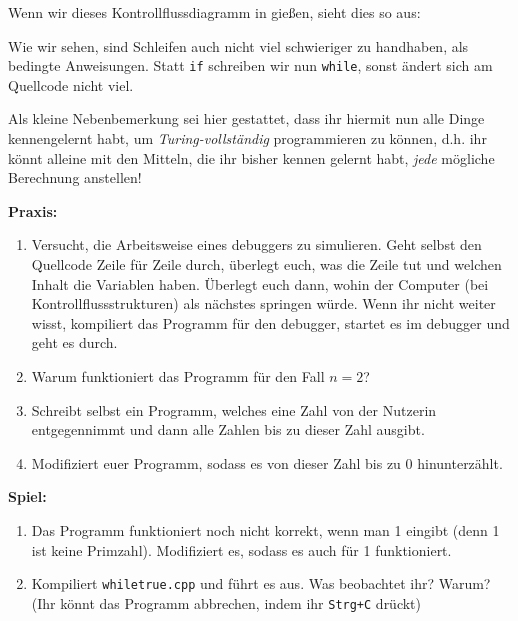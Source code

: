 Wenn wir dieses Kontrollflussdiagramm in \Cpp gießen, sieht dies so aus:

Wie wir sehen, sind Schleifen auch nicht viel schwieriger zu handhaben, als
bedingte Anweisungen. Statt \texttt{if} schreiben wir nun \texttt{while}, sonst
ändert sich am Quellcode nicht viel.

Als kleine Nebenbemerkung sei hier gestattet, dass ihr hiermit nun alle Dinge
kennengelernt habt, um \emph{Turing-vollständig} programmieren zu können, d.h.
ihr könnt alleine mit den Mitteln, die ihr bisher kennen gelernt habt,
\emph{jede} mögliche Berechnung anstellen!

\textbf{Praxis:}
\begin{enumerate}
    \item Versucht, die Arbeitsweise eines debuggers zu simulieren. Geht selbst
        den Quellcode Zeile für Zeile durch, überlegt euch, was die Zeile tut
        und welchen Inhalt die Variablen haben. Überlegt euch dann, wohin der
        Computer (bei Kontrollflussstrukturen) als nächstes springen würde.
        Wenn ihr nicht weiter wisst, kompiliert das Programm für den debugger,
        startet es im debugger und geht es durch.
    \item Warum funktioniert das Programm für den Fall $n = 2$?
    \item Schreibt selbst ein Programm, welches eine Zahl von der Nutzerin
        entgegennimmt und dann alle Zahlen bis zu dieser Zahl ausgibt.
    \item Modifiziert euer Programm, sodass es von dieser Zahl bis zu 0
        hinunterzählt.
\end{enumerate}

\textbf{Spiel:}
\begin{enumerate}
    \item Das Programm funktioniert noch nicht korrekt, wenn man 1 eingibt
        (denn 1 ist keine Primzahl). Modifiziert es, sodass es auch für 1
        funktioniert.
    \item Kompiliert \texttt{whiletrue.cpp} und führt es aus. Was beobachtet
        ihr? Warum? (Ihr könnt das Programm abbrechen, indem ihr
        \texttt{Strg+C} drückt)
\end{enumerate}

